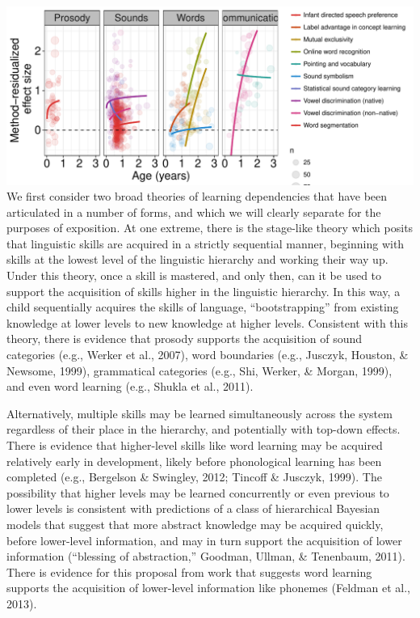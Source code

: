 \documentclass[english,floatsintext,man]{apa6}
\theoremstyle{definition}
\theoremstyle{definition}
\theoremstyle{remark}
\begin{document}
\includegraphics{figs/fig3.pdf} We first consider two broad theories of
learning dependencies that have been articulated in a number of forms,
and which we will clearly separate for the purposes of exposition. At
one extreme, there is the stage-like theory which posits that linguistic
skills are acquired in a strictly sequential manner, beginning with
skills at the lowest level of the linguistic hierarchy and working their
way up. Under this theory, once a skill is mastered, and only then, can
it be used to support the acquisition of skills higher in the linguistic
hierarchy. In this way, a child sequentially acquires the skills of
language, \enquote{bootstrapping} from existing knowledge at lower
levels to new knowledge at higher levels. Consistent with this theory,
there is evidence that prosody supports the acquisition of sound
categories (e.g., Werker et al., 2007), word boundaries (e.g., Jusczyk,
Houston, \& Newsome, 1999), grammatical categories (e.g., Shi, Werker,
\& Morgan, 1999), and even word learning (e.g., Shukla et al., 2011).

Alternatively, multiple skills may be learned simultaneously across the
system regardless of their place in the hierarchy, and potentially with
top-down effects. There is evidence that higher-level skills like word
learning may be acquired relatively early in development, likely before
phonological learning has been completed (e.g., Bergelson \& Swingley,
2012; Tincoff \& Jusczyk, 1999). The possibility that higher levels may
be learned concurrently or even previous to lower levels is consistent
with predictions of a class of hierarchical Bayesian models that suggest
that more abstract knowledge may be acquired quickly, before lower-level
information, and may in turn support the acquisition of lower
information (``blessing of abstraction,'' Goodman, Ullman, \& Tenenbaum,
2011). There is evidence for this proposal from work that suggests word
learning supports the acquisition of lower-level information like
phonemes (Feldman et al., 2013).
\end{document}
